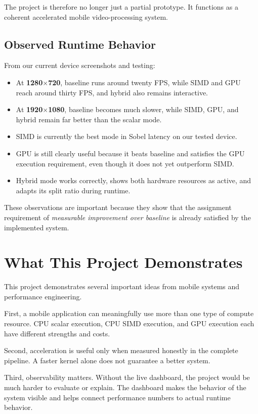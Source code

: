 \documentclass[12pt,a4paper]{article}
\begin{document}
The project is therefore no longer just a partial prototype. It functions as a coherent accelerated mobile video-processing system.

\subsection{Observed Runtime Behavior}

From our current device screenshots and testing:

\begin{itemize}
\item At \textbf{1280$\times$720}, baseline runs around twenty FPS, while SIMD and GPU reach around thirty FPS, and hybrid also remains interactive.
\item At \textbf{1920$\times$1080}, baseline becomes much slower, while SIMD, GPU, and hybrid remain far better than the scalar mode.
\item SIMD is currently the best mode in Sobel latency on our tested device.
\item GPU is still clearly useful because it beats baseline and satisfies the GPU execution requirement, even though it does not yet outperform SIMD.
\item Hybrid mode works correctly, shows both hardware resources as active, and adapts its split ratio during runtime.
\end{itemize}

These observations are important because they show that the assignment requirement of \textit{measurable improvement over baseline} is already satisfied by the implemented system.


\section{What This Project Demonstrates}

This project demonstrates several important ideas from mobile systems and performance engineering.

First, a mobile application can meaningfully use more than one type of compute resource. CPU scalar execution, CPU SIMD execution, and GPU execution each have different strengths and costs.

Second, acceleration is useful only when measured honestly in the complete pipeline. A faster kernel alone does not guarantee a better system.

Third, observability matters. Without the live dashboard, the project would be much harder to evaluate or explain. The dashboard makes the behavior of the system visible and helps connect performance numbers to actual runtime behavior.
\end{document}
